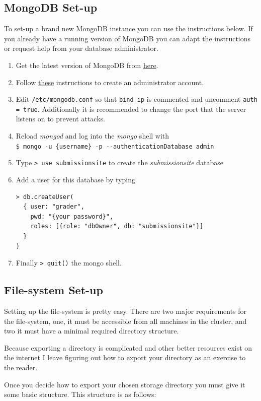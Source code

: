 \documentclass[11pt]{report}
\begin{document}
\subsection{MongoDB Set-up}
To set-up a brand new MongoDB instance you can use the instructions below. If you already have a running version
of MongoDB you can adapt the instructions or request help from your database administrator.
\begin{enumerate}
\item Get the latest version of MongoDB from \href{http://docs.mongodb.org/manual/tutorial/install-mongodb-on-ubuntu/}{here}.
\item Follow \href{http://docs.mongodb.org/manual/tutorial/enable-authentication/}{these} instructions to create an administrator account.
\item Edit \verb|/etc/mongodb.conf| so that 
\verb|bind_ip| is commented and uncomment
\verb|auth = true|. Additionally it is recommended to change the port that the server listens on
to prevent attacks.
\item Reload \emph{mongod} and log into the \emph{mongo} shell with\\
\verb|$ mongo -u {username} -p --authenticationDatabase admin|
\item Type \verb|> use submissionsite| to create the \emph{submissionsite} database
\item Add a user for this database by typing
\begin{verbatim}
> db.createUser(
  { user: "grader", 
    pwd: "{your password}",
    roles: [{role: "dbOwner", db: "submissionsite"}] 
  }
)
\end{verbatim}
\item Finally \verb|> quit()| the mongo shell.
\end{enumerate}

\subsection{File-system Set-up}
Setting up the file-system is pretty easy. There are two major requirements for the file-system, one, it
must be accessible from all machines in the cluster, and two it must have a minimal required directory
structure.

Because exporting a directory is complicated and other better resources exist on the internet I leave
figuring out how to export your directory as an exercise to the reader.

Once you decide how to export your chosen storage directory you must give it some basic structure. This
structure is as follows:
\end{document}
